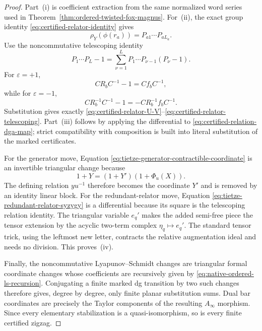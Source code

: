 \documentclass[11pt]{article}
\theoremstyle{definition}
\begin{document}
\begin{proof}
Part~(i) is coefficient extraction from the same normalized word series used
in Theorem~\ref{thm:ordered-twisted-fox-magnus}.  For~(ii), the exact group
identity \eqref{eq:certified-relator-identity} gives
\[
 \rho_Y(\phi(r_a))
 =P_{a1}\cdots P_{aL_a}.
\]
Use the noncommutative telescoping identity
\[
 P_1\cdots P_L-1
 =\sum_{\nu=1}^{L}P_1\cdots P_{\nu-1}(P_\nu-1).
\]
For $\varepsilon=+1$,
\[
 C R_b C^{-1}-1=Cf_bC^{-1},
\]
while for $\varepsilon=-1$,
\[
 C R_b^{-1}C^{-1}-1
 =-CR_b^{-1}f_bC^{-1}.
\]
Substitution gives exactly
\eqref{eq:certified-relator-U-V}--\eqref{eq:certified-relator-telescoping}.
Part~(iii) follows by applying the differential to
\eqref{eq:certified-relation-dga-map}; strict compatibility with composition
is built into literal substitution of the marked certificates.

For the generator move, Equation
\eqref{eq:tietze-generator-contractible-coordinate} is an invertible
triangular change because
\[
 1+Y=(1+Y')(1+\Phi_u(X)).
\]
The defining relation $yu^{-1}$ therefore becomes the coordinate $Y'$ and is
removed by an identity linear block.  For the redundant-relator move,
Equation \eqref{eq:tietze-redundant-relator-syzygy} is a differential because
its square is the telescoping relation identity.  The triangular variable
$e_q'$ makes the added semi-free piece the tensor extension by the acyclic
two-term complex $\eta_q\mapsto e_q'$.  The standard tensor trick, using the
leftmost new letter, contracts the relative augmentation ideal and needs no
division.  This proves~(iv).

Finally, the noncommutative Lyapunov--Schmidt changes are triangular formal
coordinate changes whose coefficients are recursively given by
\eqref{eq:native-ordered-ls-recursion}.  Conjugating a finite marked dg
transition by two such changes therefore gives, degree by degree, only finite
planar substitution sums.  Dual bar coordinates are precisely the Taylor
components of the resulting $A_\infty$ morphism.  Since every elementary
stabilization is a quasi-isomorphism, so is every finite certified zigzag.
\end{proof}
\end{document}
